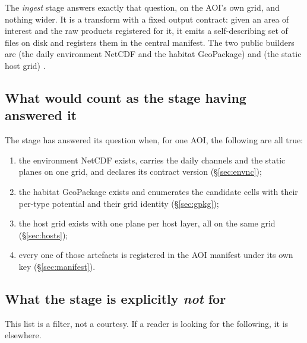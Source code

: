 \documentclass[11pt,a4paper]{article} \usepackage[utf8]{inputenc} \usepackage{lmodern} \usepackage[T1]{fontenc}
\begin{document}
The \emph{ingest} stage answers exactly that question, on the AOI's own grid, and nothing wider.
It is a transform with a fixed output contract: given an area of interest and the raw products
registered for it, it emits a self-describing set of files on disk and registers them in the
central manifest. The two public builders are  (the daily environment
NetCDF and the habitat GeoPackage) and  (the static host grid)
.

\subsection{What would count as the stage having answered it}

The stage has answered its question when, for one AOI, the following are all true:

\begin{enumerate}
\item the environment NetCDF exists, carries the daily channels and the static planes on one
grid, and declares its contract version (\S\ref{sec:envnc}); 
\item the habitat GeoPackage exists
and enumerates the candidate cells with their per-type potential and their grid identity
(\S\ref{sec:gpkg}); 
\item the host grid exists with one plane per host layer, all on the same
grid (\S\ref{sec:hosts}); 
\item every one of those artefacts is registered in the AOI manifest
under its own key (\S\ref{sec:manifest}).
\end{enumerate}

\subsection{What the stage is explicitly \emph{not} for}

This list is a filter, not a courtesy. If a reader is looking for the following, it is
elsewhere.
\end{document}
